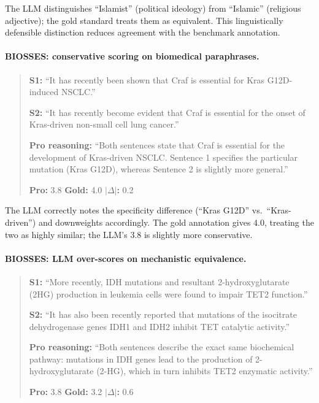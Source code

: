 \noindent The LLM distinguishes ``Islamist'' (political ideology) from ``Islamic'' (religious adjective); the gold standard treats them as equivalent.
This linguistically defensible distinction reduces agreement with the benchmark annotation.

\paragraph{BIOSSES: conservative scoring on biomedical paraphrases.}
\begin{quote}
\small
\textbf{S1:} ``It has recently been shown that Craf is essential for Kras G12D-induced NSCLC.''

\textbf{S2:} ``It has recently become evident that Craf is essential for the onset of Kras-driven non-small cell lung cancer.''

\textbf{Pro reasoning:} ``Both sentences state that Craf is essential for the development of Kras-driven NSCLC. Sentence 1 specifies the particular mutation (Kras G12D), whereas Sentence 2 is slightly more general.''

\textbf{Pro:} 3.8 \quad \textbf{Gold:} 4.0 \quad \textbf{$|\Delta|$:} 0.2
\end{quote}

\noindent The LLM correctly notes the specificity difference (``Kras G12D'' vs.\ ``Kras-driven'') and downweights accordingly.
The gold annotation gives 4.0, treating the two as highly similar; the LLM's 3.8 is slightly more conservative.

\paragraph{BIOSSES: LLM over-scores on mechanistic equivalence.}
\begin{quote}
\small
\textbf{S1:} ``More recently, IDH mutations and resultant 2-hydroxyglutarate (2HG) production in leukemia cells were found to impair TET2 function.''

\textbf{S2:} ``It has also been recently reported that mutations of the isocitrate dehydrogenase genes IDH1 and IDH2 inhibit TET catalytic activity.''

\textbf{Pro reasoning:} ``Both sentences describe the exact same biochemical pathway: mutations in IDH genes lead to the production of 2-hydroxyglutarate (2-HG), which in turn inhibits TET2 enzymatic activity.''

\textbf{Pro:} 3.8 \quad \textbf{Gold:} 3.2 \quad \textbf{$|\Delta|$:} 0.6
\end{quote}


